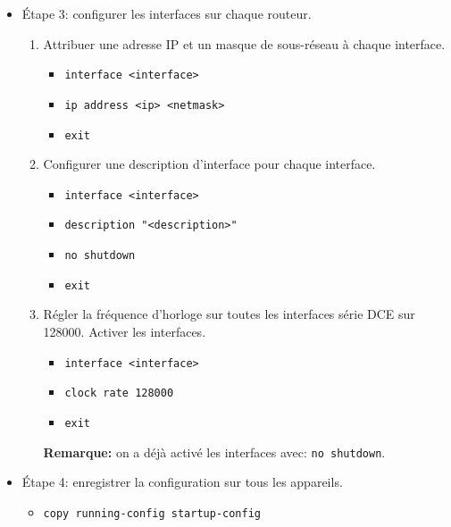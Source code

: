 \documentclass[a4paper]{article}
\begin{document}
\begin{itemize}
\item Étape 3: configurer les interfaces sur chaque routeur.
\begin{enumerate}
    \item Attribuer une adresse IP et un masque de sous-réseau à chaque interface.
    \begin{example}
        \begin{itemize}
            \item \texttt{interface <interface>}
            \item \texttt{ip address <ip> <netmask>}
            \item \texttt{exit}
        \end{itemize}
    \end{example}
    \item Configurer une description d'interface pour chaque interface.
    \begin{example}
        \begin{itemize}
            \item \texttt{interface <interface>}
            \item \texttt{description "<description>"}
            \item \texttt{no shutdown}
            \item \texttt{exit}
        \end{itemize}
    \end{example}
    \item Régler la fréquence d'horloge sur toutes les interfaces série DCE sur 128000. Activer les interfaces.
    \begin{example}
        \begin{itemize}
            \item \texttt{interface <interface>}
            \item \texttt{clock rate 128000}
            \item \texttt{exit}
        \end{itemize}
        \textbf{Remarque:} on a déjà activé les interfaces avec: \texttt{no shutdown}.
    \end{example}
\end{enumerate}





\item Étape 4: enregistrer la configuration sur tous les appareils.
\begin{example}
    \begin{itemize}
        \item \texttt{copy running-config startup-config}
    \end{itemize}
\end{example}






\end{itemize}
\end{document}
